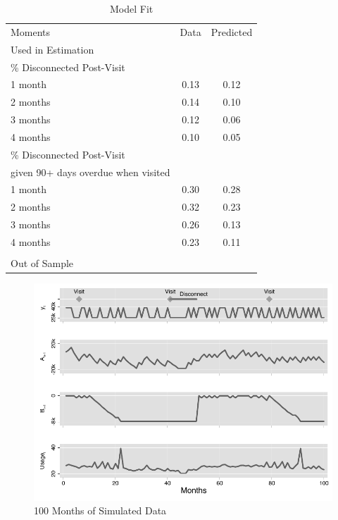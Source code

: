 \documentclass[12pt]{article}
\begin{document}
\begin{table}[H]
\centering
\caption{Model Fit}\label{table:fit}

\begin{tabular}{l*{1}{cc}}
\toprule
 Moments & Data  & Predicted \\[.5em]
Used in Estimation & & \\
\midrule
[.5em]
\% Disconnected Post-Visit  & & \\[.2em]
1 month &0.13&0.12\\
2 months &0.14&0.10\\
3 months  &0.12&0.06\\
4 months &0.10&0.05\\[.8em]
\% Disconnected Post-Visit & & \\
given 90+ days overdue when visited & & \\[.2em]
1 month &0.30&0.28\\
2 months &0.32&0.23\\
3 months &0.26&0.13\\
4 months &0.23&0.11\\
& & \\
Out of Sample & & \\
\midrule

\bottomrule
\end{tabular}

%
\end{table}

\begin{figure}[H]
\centering
\caption{100 Months of Simulated Data}\label{figure:deaton}
\includegraphics[scale=1.1]{tables/new_deaton_graph.pdf}
\end{figure}
\end{document}
